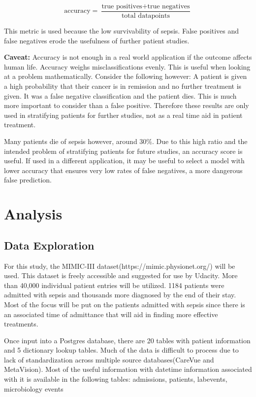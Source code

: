 \documentclass[11pt]{article}
\begin{document}
\[ \text{accuracy} = \frac{\text{true positives} + \text{true negatives}} {\text{total datapoints}} \]



This metric is used because the low survivability of sepsis. False positives and false negatives erode the usefulness of further patient studies.

\textbf{Caveat:} Accuracy is not enough in a real world application if the outcome affects human life. Accuracy weighs misclassifications evenly. This is useful when looking at a problem mathematically. Consider the following however: A patient is given a high probability that their cancer is in remission and no further treatment is given. It was a false negative classification and the patient dies. This is much more important to consider than a false positive. Therefore these results are only used in stratifying patients for further studies, not as a real time aid in patient treatment.

Many patients die of sepsis however, around 30\%. Due to this high ratio and the intended problem of stratifying patients for future studies, an accuracy score is useful. If used in a different application, it may be useful to select a model with lower accuracy that ensures very low rates of false negatives, a more dangerous false prediction.

\section{Analysis}
\subsection{Data Exploration}
For this study, the MIMIC-III dataset(https://mimic.physionet.org/) will be used. This dataset is freely accessible and suggested for use by Udacity. More than 40,000 individual patient entries will be utilized. 1184 patients were admitted with sepsis and thousands more diagnosed by the end of their stay. Most of the focus will be put on the patients admitted with sepsis since there is an associated time of admittance that will aid in finding more effective treatments.

Once input into a Postgres database, there are 20 tables with patient information and 5 dictionary lookup tables. Much of the data is difficult to process due to lack of standardization across multiple source databases(CareVue and MetaVision). Most of the useful information with datetime information associated with it is available in the following tables: admissions, patients, labevents, microbiology events
\end{document}
